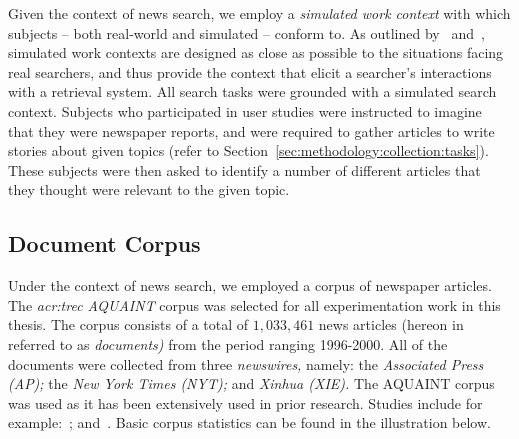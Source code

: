Given the context of news search, we employ a \emph{simulated work context} with which subjects -- both real-world and simulated -- conform to. As outlined by~\cite{borlund2000simulated_work_tasks} and~\cite{li2013simulated_work_tasks}, simulated work contexts are designed as close as possible to the situations facing real searchers, and thus provide the context that elicit a searcher's interactions with a retrieval system. All search tasks were grounded with a simulated search context. Subjects who participated in user studies were instructed to imagine that they were newspaper reports, and were required to gather articles to write stories about given topics (refer to Section~\ref{sec:methodology:collection:tasks}). These subjects were then asked to identify a number of different articles that they thought were relevant to the given topic.

\subsection{Document Corpus}\label{sec:methodology:collection:corpus}
Under the context of news search, we employed a corpus of newspaper articles. The \emph{\gls{acr:trec} AQUAINT} corpus was selected for all experimentation work in this thesis. The corpus consists of a total of $1,033,461$ news articles (hereon in referred to as \emph{documents)} from the period ranging 1996-2000. All of the documents were collected from three \emph{newswires,} namely: the \emph{Associated Press (AP);} the \emph{New York Times (NYT);} and \emph{Xinhua (XIE).} The AQUAINT corpus was used as it has been extensively used in prior research. Studies include for example:~\cite{collinsthompson2004retrieval_quality, ofoghi2006passage_retrieval, baillie2006query_sampling, azzopardi2008retrievability, kelly2009user_study, azzopardi2013query_cost, maxwell2014temporal_delays, harvey2017searching, yang2017can}; and~\cite{wilkie2017bias}. Basic corpus statistics can be found in the illustration below.

\begin{figure}[h]
    \centering
    \vspace{6mm}
    \vspace{-9mm}
    \label{fig:aquaint_stats}
\end{figure}

